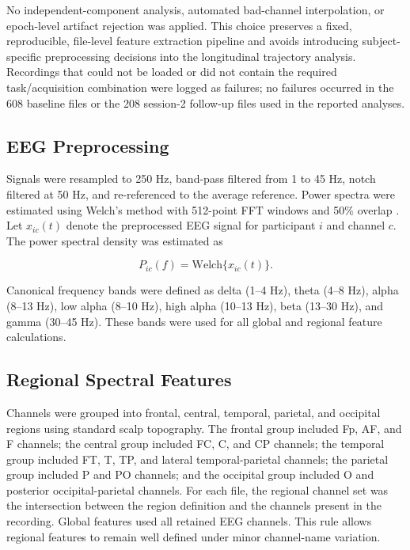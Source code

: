 \documentclass[journal]{IEEEtran}
\begin{document}
No independent-component analysis, automated bad-channel interpolation, or epoch-level artifact rejection was applied. This choice preserves a fixed, reproducible, file-level feature extraction pipeline and avoids introducing subject-specific preprocessing decisions into the longitudinal trajectory analysis. Recordings that could not be loaded or did not contain the required task/acquisition combination were logged as failures; no failures occurred in the 608 baseline files or the 208 session-2 follow-up files used in the reported analyses.

\subsection{EEG Preprocessing}

Signals were resampled to 250 Hz, band-pass filtered from 1 to 45 Hz, notch filtered at 50 Hz, and re-referenced to the average reference. Power spectra were estimated using Welch's method with 512-point FFT windows and 50\% overlap \cite{welch1967use,cohen2014analyzing}. Let $x_{ic}(t)$ denote the preprocessed EEG signal for participant $i$ and channel $c$. The power spectral density was estimated as

\begin{equation}
P_{ic}(f)=\mathrm{Welch}\{x_{ic}(t)\}.
\end{equation}

Canonical frequency bands were defined as delta (1--4 Hz), theta (4--8 Hz), alpha (8--13 Hz), low alpha (8--10 Hz), high alpha (10--13 Hz), beta (13--30 Hz), and gamma (30--45 Hz). These bands were used for all global and regional feature calculations.

\subsection{Regional Spectral Features}

Channels were grouped into frontal, central, temporal, parietal, and occipital regions using standard scalp topography. The frontal group included Fp, AF, and F channels; the central group included FC, C, and CP channels; the temporal group included FT, T, TP, and lateral temporal-parietal channels; the parietal group included P and PO channels; and the occipital group included O and posterior occipital-parietal channels. For each file, the regional channel set was the intersection between the region definition and the channels present in the recording. Global features used all retained EEG channels. This rule allows regional features to remain well defined under minor channel-name variation.
\end{document}
